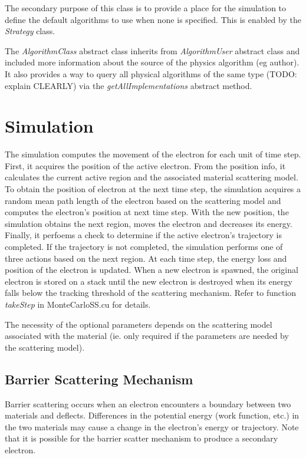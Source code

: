 The secondary purpose of this class is to provide a place for the simulation to define the default algorithms to use when none is specified. This is enabled by the \textit{Strategy} class.

The \textit{AlgorithmClass} abstract class inherits from \textit{AlgorithmUser} abstract class and included more information about the source of the physics algorithm (eg author). It also provides a way to query all physical algorithms of the same type (TODO: explain CLEARLY) via the \textit{getAllImplementations} abstract method.

\section{Simulation}\label{impl:sim}
The simulation computes the movement of the electron for each unit of time step. First, it acquires the position of the active electron. From the position info, it calculates the current active region and the associated material scattering model. To obtain the position of electron at the next time step, the simulation acquires a random mean path length of the electron based on the scattering model and computes the electron's position at next time step. With the new position, the simulation obtains the next region, moves the electron and decreases its energy. Finally, it perfoems a check to determine if the active electron's trajectory is completed. If the trajectory is not completed, the simulation performs one of three actions based on the next region. At each time step, the energy loss and position of the electron is updated. When a new electron is spawned, the original electron is stored on a stack until the new electron is destroyed when its energy falls below the tracking threshold of the scattering mechanism. Refer to function \textit{takeStep} in MonteCarloSS.cu for details. 

The necessity of the optional parameters depends on the scattering model associated with the material (ie. only required if the parameters are needed by the scattering model).

\subsection{Barrier Scattering Mechanism}\label{impl:barrier_sm}
Barrier scattering occurs when an electron encounters a boundary between two materials and deflects. Differences in the potential energy (work function, etc.) in the two materials may cause a change in the electron's energy or trajectory. Note that it is possible for the barrier scatter mechanism to produce a secondary electron. 

